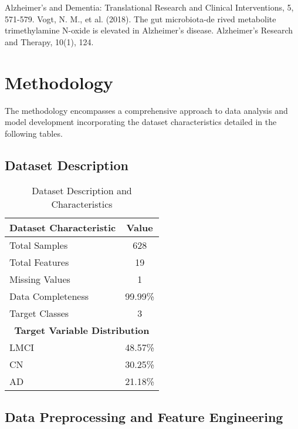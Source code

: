 \documentclass[conference]{IEEEtran}
\begin{document}
Alzheimer's and Dementia: Translational Research and Clinical Interventions, 5, 571-579. Vogt, N. M., et al. (2018). The gut microbiota-de rived metabolite trimethylamine N-oxide is elevated in Alzheimer's disease. Alzheimer's Research and Therapy, 10(1), 124.

\section{Methodology}
The methodology encompasses a comprehensive approach to data analysis and model development incorporating the dataset characteristics detailed in the following tables.

\subsection{Dataset Description}

\begin{table}[!h]
\centering
\caption{Dataset Description and Characteristics}
\label{tab:dataset_description}
\begin{tabular}{|l|c|}
\hline
\textbf{Dataset Characteristic} & \textbf{Value} \\
\hline
Total Samples & 628 \\
\hline
Total Features & 19 \\
\hline
Missing Values & 1 \\
\hline
Data Completeness & 99.99\% \\
\hline
Target Classes & 3 \\
\hline
\hline
\multicolumn{2}{|c|}{\textbf{Target Variable Distribution}} \\
\hline
LMCI & 48.57\% \\
\hline
CN & 30.25\% \\
\hline
AD & 21.18\% \\
\hline
\end{tabular}
\end{table}



\subsection{Data Preprocessing and Feature Engineering}
\end{document}
